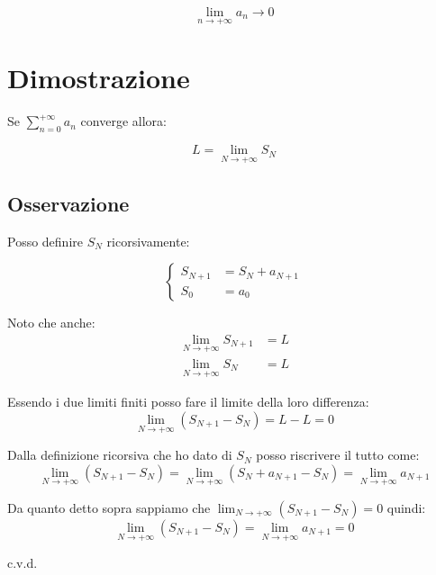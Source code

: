 \documentclass[../dimostrazioni]{subfiles}
\begin{document}
                \[  \lim_{n \to +\infty} a_n \rightarrow 0  \]

        \section*{Dimostrazione}

            Se \(\sum_{n=0}^{+\infty} a_n \) converge allora:

            \[  L = \lim_{N \to +\infty} S_N   \]

            \subsection*{Osservazione}

                Posso definire \(S_N\) ricorsivamente:

                \[  
                    \left\{
                        \begin{aligned}
                            S_{N+1} &= S_N + a_{N+1}\\
                            S_0 &= a_0
                        \end{aligned}
                    \right.
                \]

            Noto che anche:
            \begin{align*}
                \lim_{N \to +\infty} S_{N+1} &= L\\
                \lim_{N \to +\infty} S_{N} &= L
            \end{align*}
            
            Essendo i due limiti finiti posso fare il limite della loro differenza:
            \[  \lim_{N \to +\infty}\left(S_{N+1} - S_N \right) = L - L = 0  \]

            Dalla definizione ricorsiva che ho dato di \(S_N\) posso riscrivere il tutto come:
            \[  \lim_{N \to +\infty}\left(S_{N+1} - S_N \right) = \lim_{N \to +\infty} \left(S_N + a_{N+1} - S_N \right) = \lim_{N \to +\infty} a_{N+1} \]

            Da quanto detto sopra sappiamo che \(  \lim_{N \to +\infty}\left(S_{N+1} - S_N \right) = 0  \) quindi:
            \[  \lim_{N \to +\infty}\left(S_{N+1} - S_N \right) = \lim_{N \to +\infty} a_{N+1} = 0 \]

            c.v.d.
\end{document}
